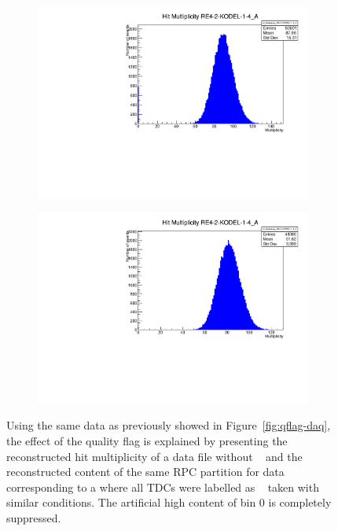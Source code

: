 	\begin{figure}[H]
        \begin{subfigure}{0.5\linewidth}
		    \centering
			\includegraphics[width = \linewidth]{fig/app1/No_Qflag_nhits_KODEL.pdf}
			\caption{\label{fig:qflag-kodel:A}}
		\end{subfigure}
		\begin{subfigure}{0.5\linewidth}
		    \centering
			\includegraphics[width = \linewidth]{fig/app1/With_Qflag_nhits_KODEL.pdf}
			\caption{\label{fig:qflag-kodel:B}}
		\end{subfigure}
		\caption{\label{fig:qflag-kodel} Using the same data as previously showed in Figure~\ref{fig:qflag-daq}, the effect of the quality flag is explained by presenting the reconstructed hit multiplicity of a data file without ~ and the reconstructed content of the same RPC partition for data corresponding to a  where all TDCs were labelled as ~ taken with similar conditions. The artificial high content of bin 0 is completely suppressed.}
	\end{figure}
	
